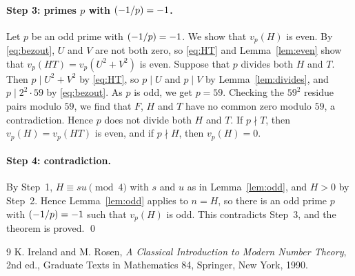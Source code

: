 \documentclass[11pt]{article}
\newcommand{\leg}[2]{\mathchoice{\biggl(\dfrac{#1}{#2}\biggr)}{(#1/#2)}{(#1/#2)}{(#1/#2)}}
\begin{document}
\paragraph{\texorpdfstring{Step 3: primes $p$ with $\leg{-1}{p}=-1$.}{Step 3: inert primes.}} Let $p$ be an odd prime with $\leg{-1}{p}=-1$. We show that $v_p(H)$ is even. By \eqref{eq:bezout}, $U$ and $V$ are not both zero, so \eqref{eq:HT} and Lemma~\ref{lem:even} show that $v_p(HT)=v_p(U^2+V^2)$ is even. Suppose that $p$ divides both $H$ and $T$. Then $p\mid U^2+V^2$ by \eqref{eq:HT}, so $p\mid U$ and $p\mid V$ by Lemma~\ref{lem:divides}, and $p\mid 2^{2}\cdot 59$ by \eqref{eq:bezout}. As $p$ is odd, we get $p=59$. Checking the $59^2$ residue pairs modulo $59$, we find that $F$, $H$ and $T$ have no common zero modulo $59$, a contradiction. Hence $p$ does not divide both $H$ and $T$. If $p\nmid T$, then $v_p(H)=v_p(HT)$ is even, and if $p\nmid H$, then $v_p(H)=0$.

\paragraph{Step 4: contradiction.} By Step~1, $H\equiv su\pmod{4}$ with $s$ and $u$ as in Lemma~\ref{lem:odd}, and $H>0$ by Step~2. Hence Lemma~\ref{lem:odd} applies to $n=H$, so there is an odd prime $p$ with $\leg{-1}{p}=-1$ such that $v_p(H)$ is odd. This contradicts Step~3, and the theorem is proved.
\qed

\begin{thebibliography}{9}
 K. Ireland and M. Rosen, \emph{A Classical Introduction to Modern Number Theory}, 2nd ed., Graduate Texts in Mathematics 84, Springer, New York, 1990.
\end{thebibliography}
\end{document}
